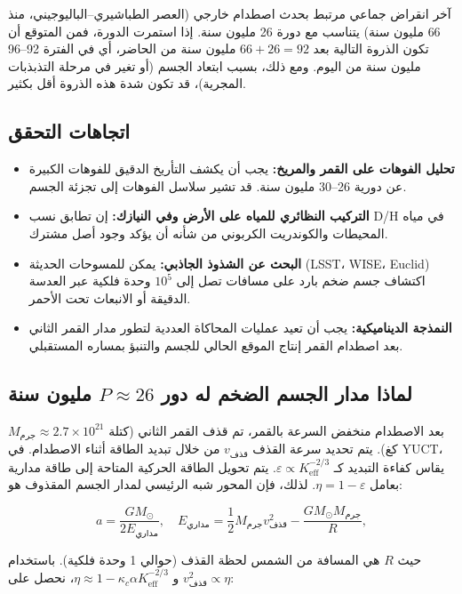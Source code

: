 \documentclass[11pt,a4paper]{article}
\begin{document}
	آخر انقراض جماعي مرتبط بحدث اصطدام خارجي (العصر الطباشيري–الباليوجيني، منذ 66 مليون سنة) يتناسب مع دورة 26 مليون سنة. إذا استمرت الدورة، فمن المتوقع أن تكون الذروة التالية بعد \(66 + 26 = 92\) مليون سنة من الحاضر، أي في الفترة 92–96 مليون سنة من اليوم. ومع ذلك، بسبب ابتعاد الجسم (أو تغير في مرحلة التذبذبات المجرية)، قد تكون شدة هذه الذروة أقل بكثير.
	
	\subsection{اتجاهات التحقق}
	
	\begin{itemize}
		\item \textbf{تحليل الفوهات على القمر والمريخ:} يجب أن يكشف التأريخ الدقيق للفوهات الكبيرة عن دورية 26–30 مليون سنة. قد تشير سلاسل الفوهات إلى تجزئة الجسم.
		\item \textbf{التركيب النظائري للمياه على الأرض وفي النيازك:} إن تطابق نسب D/H في مياه المحيطات والكوندريت الكربوني من شأنه أن يؤكد وجود أصل مشترك.
		\item \textbf{البحث عن الشذوذ الجاذبي:} يمكن للمسوحات الحديثة (LSST، WISE، Euclid) اكتشاف جسم ضخم بارد على مسافات تصل إلى \(10^5\) وحدة فلكية عبر العدسة الدقيقة أو الانبعاث تحت الأحمر.
		\item \textbf{النمذجة الديناميكية:} يجب أن تعيد عمليات المحاكاة العددية لتطور مدار القمر الثاني بعد اصطدام القمر إنتاج الموقع الحالي للجسم والتنبؤ بمساره المستقبلي.
	\end{itemize}
	
	\subsection{لماذا مدار الجسم الضخم له دور \(P \approx 26\) مليون سنة}
	
	بعد الاصطدام منخفض السرعة بالقمر، تم قذف القمر الثاني (كتلة \(M_{\text{جرم}} \approx 2.7\times10^{21}\) كغ). يتم تحديد سرعة القذف \(v_{\text{قذف}}\) من خلال تبديد الطاقة أثناء الاصطدام. في YUCT، يقاس كفاءة التبديد كـ \(\varepsilon \propto K_{\mathrm{eff}}^{-2/3}\). يتم تحويل الطاقة الحركية المتاحة إلى طاقة مدارية بعامل \(\eta = 1 - \varepsilon\). لذلك، فإن المحور شبه الرئيسي لمدار الجسم المقذوف هو:
	
	\[
	a = \frac{GM_{\odot}}{2E_{\text{مداري}}}, \quad E_{\text{مداري}} = \frac{1}{2} M_{\text{جرم}} v_{\text{قذف}}^2 - \frac{GM_{\odot}M_{\text{جرم}}}{R},
	\]
	
	حيث \(R\) هي المسافة من الشمس لحظة القذف (حوالي 1 وحدة فلكية). باستخدام \(v_{\text{قذف}}^2 \propto \eta\) و \(\eta \approx 1 - \kappa_c \alpha K_{\mathrm{eff}}^{-2/3}\)، نحصل على:
	
\end{document}
